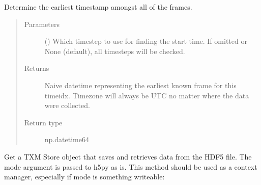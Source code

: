 \documentclass[letterpaper,10pt,english]{sphinxmanual}
\begin{document}
\begin{fulllineitems}
\begin{fulllineitems}
\label{\detokenize{xanespy:xanespy.xanes_frameset.XanesFrameset.starttime}}
Determine the earliest timestamp amongst all of the frames.
\begin{quote}\begin{description}
\item[{Parameters}] \leavevmode
{} (\sphinxstyleliteralemphasis{, }) \textendash{} Which timestep to use for finding the start time. If
omitted or None (default), all timesteps will be checked.

\item[{Returns}] \leavevmode
{} \textendash{} Naive datetime representing the earliest known frame for
this timeidx. Timezone will always be UTC no matter where
the data were collected.

\item[{Return type}] \leavevmode
np.datetime64

\end{description}\end{quote}

\end{fulllineitems}


\begin{fulllineitems}
\label{\detokenize{xanespy:xanespy.xanes_frameset.XanesFrameset.store}}
Get a TXM Store object that saves and retrieves data from the HDF5
file. The mode argument is passed to h5py as is. This method
should be used as a context manager, especially if mode is
something writeable:

\begin{sphinxVerbatim}[commandchars=\\\{\}]
   
      \PYG{p}{[}\PYG{p}{]}
\end{sphinxVerbatim}


\end{fulllineitems}
\end{fulllineitems}
\end{document}
